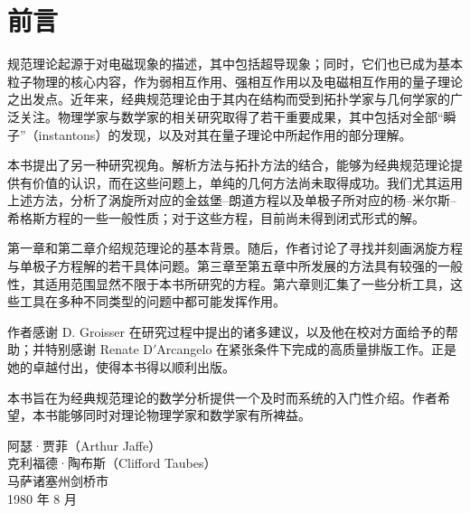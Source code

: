 \chapter*{前言}
规范理论起源于对电磁现象的描述，其中包括超导现象；同时，它们也已成为基本粒子物理的核心内容，作为弱相互作用、强相互作用以及电磁相互作用的量子理论之出发点。近年来，经典规范理论由于其内在结构而受到拓扑学家与几何学家的广泛关注。物理学家与数学家的相关研究取得了若干重要成果，其中包括对全部“瞬子”（instantons）的发现，以及对其在量子理论中所起作用的部分理解。

本书提出了另一种研究视角。解析方法与拓扑方法的结合，能够为经典规范理论提供有价值的认识，而在这些问题上，单纯的几何方法尚未取得成功。我们尤其运用上述方法，分析了涡旋所对应的金兹堡–朗道方程以及单极子所对应的杨–米尔斯–希格斯方程的一些一般性质；对于这些方程，目前尚未得到闭式形式的解。

第一章和第二章介绍规范理论的基本背景。随后，作者讨论了寻找并刻画涡旋方程与单极子方程解的若干具体问题。第三章至第五章中所发展的方法具有较强的一般性，其适用范围显然不限于本书所研究的方程。第六章则汇集了一些分析工具，这些工具在多种不同类型的问题中都可能发挥作用。

作者感谢 D. Groisser 在研究过程中提出的诸多建议，以及他在校对方面给予的帮助；并特别感谢 Renate D\('\)Arcangelo 在紧张条件下完成的高质量排版工作。正是她的卓越付出，使得本书得以顺利出版。

本书旨在为经典规范理论的数学分析提供一个及时而系统的入门性介绍。作者希望，本书能够同时对理论物理学家和数学家有所裨益。
\begin{flushright}
阿瑟·贾菲（Arthur Jaffe）\\
克利福德·陶布斯（Clifford Taubes）\\
马萨诸塞州剑桥市\\
1980 年 8 月
\end{flushright}

